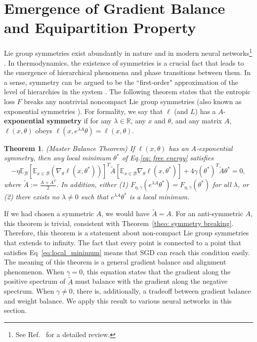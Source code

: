 \documentclass{article}
\theoremstyle{plain}
\newtheorem{theorem}{Theorem}
\begin{document}
\vspace{-2mm}
\section{Emergence of Gradient Balance and Equipartition Property}\label{sec: equipartition}
\vspace{-1mm}

Lie group symmetries exist abundantly in nature and in modern neural networks\footnote{See Ref.~\cite{ziyin2025parameter} for a detailed review.} \cite{li2016symmetry, zhao2022symmetry, ziyin2024parameter, ziyin2024symmetry, hidenori2021noether}. In thermodynamics, the existence of symmetries is a crucial fact that leads to the emergence of hierarchical phenomena and phase transitions between them. In a sense, symmetry can be argued to be the ``first-order" approximation of the level of hierarchies in the system \cite{anderson1972more}. 
The following theorem states that the entropic loss $F$ breaks any nontrivial noncompact Lie group symmetries (also known as exponential symmetries \cite{ziyin2024parameter}). For formality, we say that $\ell$ (and $L$) has a $A$-\textbf{exponential symmetry} if for any $\lambda \in \mathbb{R}$, any $x$ and $\theta$, and any matrix $A$, $\ell(x,\theta)$ obeys $\ell(x,e^{\lambda A}\theta)=\ell(x,\theta)$. 
\begin{theorem}
\label{theo:exp symmetry}
(Master Balance Theorem) If $\ell(x,\theta)$ has an $A$-exponential symmetry,
then any local minimum $\theta^*$ of Eq.\eqref{eq: free energy} satisfies
\begin{equation}
-\eta\mathbb{E}_\mathcal{B
}[\mathbb{E}_{x\in\mathcal{B}}(\nabla_\theta\ell(x,\theta^*))]^T\tilde{A}[\mathbb{E}_{x\in\mathcal{B}}\nabla_\theta\ell(x,\theta^*)]+4\gamma(\theta^*)^T\tilde{A}\theta^*=0,
\label{eq:local_minimum}
\end{equation}
where $\tilde{A}:=\frac{A+A^T}{2}$. In addition, either (1) $F_{\eta,\gamma}(e^{\lambda A}\theta^*)=F_{\eta,\gamma}(\theta^*)$ for all $\lambda$, or (2) there exists no $\lambda \neq 0$ such that $e^{\lambda A}\theta^*$ is a local minimum.
\end{theorem}

If we had chosen a symmetric $A$, we would have $\tilde{A}=A$. For an anti-symmetric $A$, this theorem is trivial, consistent with Theorem~\ref{theo: symmetry breaking}. Therefore, this theorem is a statement about non-compact Lie group symmetries that extends to infinity. The fact that every point is connected to a point that satisfies Eq~\eqref{eq:local_minimum} means that SGD can reach this condition easily. The meaning of this theorem is a general gradient balance and alignment phenomenon. When $\gamma=0$, this equation states that the gradient along the positive spectrum of $\tilde{A}$ must balance with the gradient along the negative spectrum. When $\gamma \neq 0$, there is, additionally, a tradeoff between gradient balance and weight balance. We apply this result to various neural networks in this section.
\end{document}
